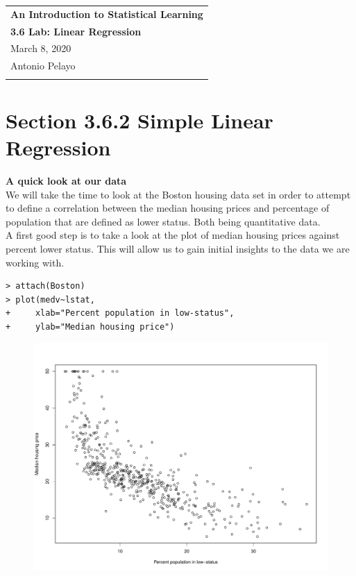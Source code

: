 \documentclass{article}
\begin{document}
\thispagestyle{empty}
\begin{tabular}{p{15.5cm}}
{\large \bf An Introduction to Statistical Learning} \\
{\large \bf 3.6 Lab: Linear Regression} \\
March 8, 2020\\
Antonio Pelayo \\
\hline
\\
\end{tabular}


\section*{Section 3.6.2 Simple Linear Regression} 
{\large \bf A quick look at our data}\\
We will take the time to look at the Boston housing data set in order to 
attempt to define a correlation between the median housing prices and percentage
of population that are defined as lower status. Both being quantitative data.\\

A first good step is to take a look at the plot of median housing prices against
percent lower status. This will allow us to gain initial insights to the data we
are working with.

\begin{verbatim}
> attach(Boston)
> plot(medv~lstat, 
+     xlab="Percent population in low-status",
+     ylab="Median housing price")
\end{verbatim}
\begin{figure}[!ht]
  \centering
  \includegraphics[width=0.65\linewidth]{plots/medv-vs-lstat.pdf}
\end{figure}
\end{document}
